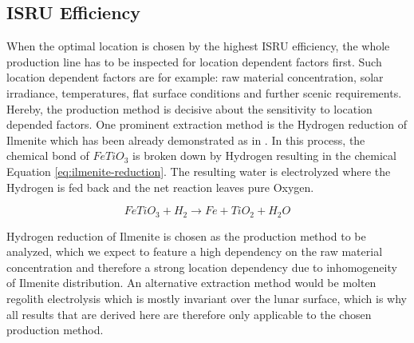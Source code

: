 \documentclass[utf8]{FrontiersinHarvard} %
\begin{document}

\subsection{ISRU Efficiency}
\label{sec:A}
When the optimal location is chosen by the highest ISRU efficiency, the whole production line has to be inspected for location dependent factors first.
Such location dependent factors are for example: raw material concentration, solar irradiance, temperatures, flat surface conditions and further scenic requirements.
Hereby, the production method is decisive about the sensitivity to location depended factors.
One prominent extraction method is the Hydrogen reduction of Ilmenite which has been already demonstrated as in \cite{Sargeant2020}. In this process, the chemical bond of $FeTiO_3$ is broken down by Hydrogen resulting in the chemical Equation \ref{eq:ilmenite-reduction}. The resulting water is electrolyzed where the Hydrogen is fed back and the net reaction leaves pure Oxygen.

\begin{equation}
FeTiO_3 + H_2 \longrightarrow Fe + TiO_2 + H_2O
\label{eq:ilmenite-reduction}
\end{equation}

Hydrogen reduction of Ilmenite is chosen as the production method to be analyzed, which we expect to feature a high dependency on the raw material concentration and therefore a strong location dependency due to inhomogeneity of Ilmenite distribution.
An alternative extraction method would be molten regolith electrolysis which is mostly invariant over the lunar surface, which is why all results that are derived here are therefore only applicable to the chosen production method.
\end{document}
